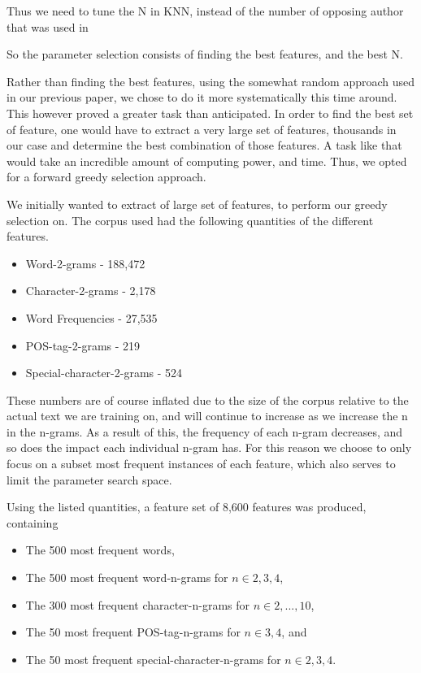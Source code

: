 Thus we need to tune the N in \gls{KNN}, instead of the number of opposing
author that was used in \cite{US}

So the parameter selection consists of finding the best features, and the best
N.

Rather than finding the best features, using the somewhat random approach used
in our previous paper\cite{US}, we chose to do it more systematically this time
around. This however proved a greater task than anticipated. In order to find
the best set of feature, one would have to extract a very large set of features,
thousands in our case and determine the best combination of those features. A
task like that would take an incredible amount of computing power, and time.
Thus, we opted for a forward greedy selection approach.

We initially wanted to extract of large set of features, to perform our greedy
selection on. The corpus used had the following quantities of the different
features.


\begin{itemize}
    \item Word-2-grams - 188,472
    \item Character-2-grams - 2,178
    \item Word Frequencies - 27,535
    \item \gls{POS}-tag-2-grams - 219
    \item Special-character-2-grams - 524
\end{itemize}

These numbers are of course inflated due to the size of the corpus relative
to the actual text we are training on, and will continue to increase as we
increase the n in the n-grams. As a result of this, the frequency of each n-gram
decreases, and so does the impact each individual n-gram has. For this reason we
choose to only focus on a subset most frequent instances of each feature, which
also serves to limit the parameter search space.

Using the listed quantities, a feature set of 8,600 features was produced,
containing

\begin{itemize}
    \item The 500 most frequent words,
    \item The 500 most frequent word-n-grams for $n \in {2,3,4}$,
    \item The 300 most frequent character-n-grams for $n \in {2,...,10}$,
    \item The 50 most frequent \gls{POS}-tag-n-grams for $n \in {3,4}$, and
    \item The 50 most frequent special-character-n-grams for $n \in {2,3,4}$.
\end{itemize}

